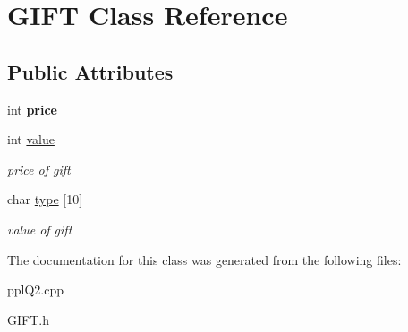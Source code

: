 \hypertarget{classGIFT}{}\section{G\+I\+FT Class Reference}
\label{classGIFT}
\subsection*{Public Attributes}
\begin{DoxyCompactItemize}
\item 
\mbox{\label{classGIFT_af2e9da1e8ab6b8aedbce10cfd26d14e4}} 
int {\bfseries price}
\item 
\mbox{\label{classGIFT_a4147df96f0f8610af3c78df7c5986640}} 
int \hyperlink{classGIFT_a4147df96f0f8610af3c78df7c5986640}{value}
\begin{DoxyCompactList}\small\item\em price of gift \end{DoxyCompactList}\item 
\mbox{\label{classGIFT_acc9e2848b7ac3250c279453d1c49641a}} 
char \hyperlink{classGIFT_acc9e2848b7ac3250c279453d1c49641a}{type} \mbox{[}10\mbox{]}
\begin{DoxyCompactList}\small\item\em value of gift \end{DoxyCompactList}\end{DoxyCompactItemize}


The documentation for this class was generated from the following files\+:\begin{DoxyCompactItemize}
\item 
ppl\+Q2.\+cpp\item 
G\+I\+F\+T.\+h\end{DoxyCompactItemize}
